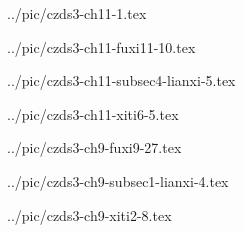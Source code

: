 

../pic/czds3-ch11-1.tex



../pic/czds3-ch11-fuxi11-10.tex



../pic/czds3-ch11-subsec4-lianxi-5.tex



../pic/czds3-ch11-xiti6-5.tex



../pic/czds3-ch9-fuxi9-27.tex



../pic/czds3-ch9-subsec1-lianxi-4.tex



../pic/czds3-ch9-xiti2-8.tex

